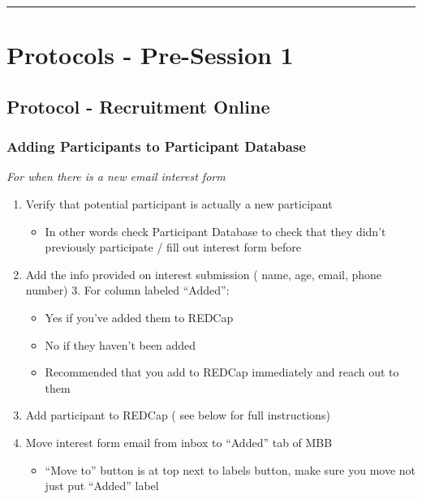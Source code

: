 \documentclass[]{book}
\providecommand{\tightlist}{%
  \setlength{\itemsep}{0pt}\setlength{\parskip}{0pt}}
\begin{document}
\begin{center}\rule{0.5\linewidth}{0.5pt}\end{center}

\hypertarget{protocols---pre-session-1}{%
\section{Protocols - Pre-Session 1}\label{protocols---pre-session-1}}

\hypertarget{protocol---recruitment-online}{%
\subsection{Protocol - Recruitment Online}\label{protocol---recruitment-online}}

\hypertarget{adding-participants-to-participant-database}{%
\subsubsection{Adding Participants to Participant Database}\label{adding-participants-to-participant-database}}

\emph{For when there is a new email interest form }

\begin{enumerate}
\def\labelenumi{\arabic{enumi}.}
\tightlist
\item
  Verify that potential participant is actually a new participant

  \begin{itemize}
  \tightlist
  \item
    In other words check Participant Database to check that they didn't previously participate / fill out interest form before
  \end{itemize}
\item
  Add the info provided on interest submission ( name, age, email, phone number) 3. For column labeled ``Added'':

  \begin{itemize}
  \tightlist
  \item
    Yes if you've added them to REDCap
  \item
    No if they haven't been added
  \item
    Recommended that you add to REDCap immediately and reach out to them
  \end{itemize}
\item
  Add participant to REDCap ( see below for full instructions)
\item
  Move interest form email from inbox to ``Added'' tab of MBB

  \begin{itemize}
  \tightlist
  \item
    ``Move to'' button is at top next to labels button, make sure you move not just put ``Added'' label
  \end{itemize}
\end{enumerate}
\end{document}
